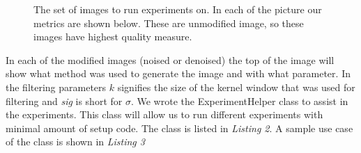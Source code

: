 \documentclass[a4paper, english]{article}
\begin{document}
\begin{figure}[h]
\centering
    \caption{The set of images to run experiments on. In each of the picture our metrics are shown below. These are unmodified image, so these images have highest quality measure.}
\end{figure}

In each of the modified images (noised or denoised) the top of the image will show what method was used to generate the image and with what parameter. In the filtering parameters $k$ signifies the size of the kernel window that was used for filtering and \textit{sig} is short for $\sigma$. We wrote the ExperimentHelper class to assist in the experiments. This class will allow us to run different experiments with minimal amount of setup code. The class is listed in \textit{Listing 2}. A sample use case of the class is shown in \textit{Listing 3}
\end{document}

